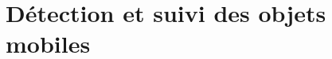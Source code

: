 \documentclass[11pt, a4paper]{book}
\begin{document}
\sloppy																%

\setcounter{tocdepth}{4}
\tableofcontents

\setcounter{chapter}{4}
\chapter{Détection et suivi des objets mobiles}




\end{document}
